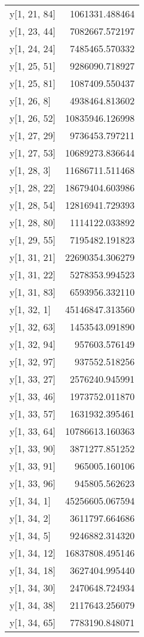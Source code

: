 \begin{longtable}{lr}
y[1, 21, 84] & 1061331.488464 \\
y[1, 23, 44] & 7082667.572197 \\
y[1, 24, 24] & 7485465.570332 \\
y[1, 25, 51] & 9286090.718927 \\
y[1, 25, 81] & 1087409.550437 \\
y[1, 26, 8] & 4938464.813602 \\
y[1, 26, 52] & 10835946.126998 \\
y[1, 27, 29] & 9736453.797211 \\
y[1, 27, 53] & 10689273.836644 \\
y[1, 28, 3] & 11686711.511468 \\
y[1, 28, 22] & 18679404.603986 \\
y[1, 28, 54] & 12816941.729393 \\
y[1, 28, 80] & 1114122.033892 \\
y[1, 29, 55] & 7195482.191823 \\
y[1, 31, 21] & 22690354.306279 \\
y[1, 31, 22] & 5278353.994523 \\
y[1, 31, 83] & 6593956.332110 \\
y[1, 32, 1] & 45146847.313560 \\
y[1, 32, 63] & 1453543.091890 \\
y[1, 32, 94] & 957603.576149 \\
y[1, 32, 97] & 937552.518256 \\
y[1, 33, 27] & 2576240.945991 \\
y[1, 33, 46] & 1973752.011870 \\
y[1, 33, 57] & 1631932.395461 \\
y[1, 33, 64] & 10786613.160363 \\
y[1, 33, 90] & 3871277.851252 \\
y[1, 33, 91] & 965005.160106 \\
y[1, 33, 96] & 945805.562623 \\
y[1, 34, 1] & 45256605.067594 \\
y[1, 34, 2] & 3611797.664686 \\
y[1, 34, 5] & 9246882.314320 \\
y[1, 34, 12] & 16837808.495146 \\
y[1, 34, 18] & 3627404.995440 \\
y[1, 34, 30] & 2470648.724934 \\
y[1, 34, 38] & 2117643.256079 \\
y[1, 34, 65] & 7783190.848071 \\

\end{longtable}
